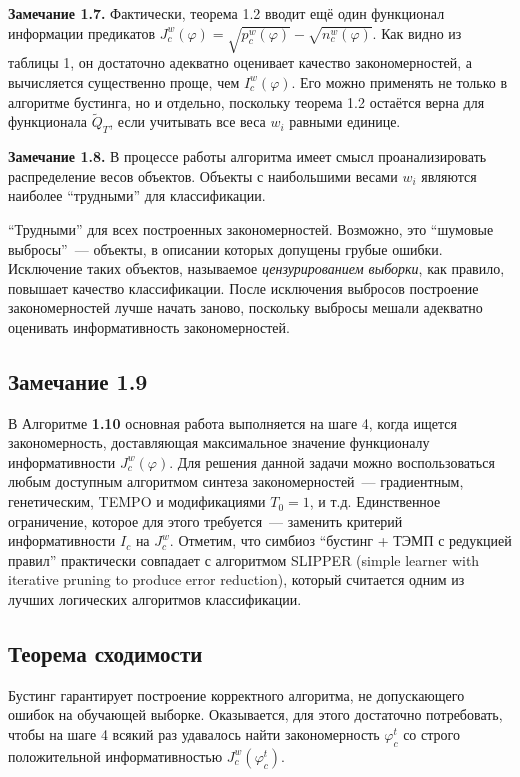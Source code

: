 \textbf{Замечание 1.7.} Фактически, теорема 1.2 вводит ещё один функционал информации предикатов $J_c^w(\varphi) = \sqrt{p_c^w(\varphi)} - \sqrt{n_c^w(\varphi)}$. Как видно из таблицы 1, он достаточно адекватно оценивает качество закономерностей, а вычисляется существенно проще, чем $I_c^w(\varphi)$. Его можно применять не только в алгоритме бустинга, но и отдельно, поскольку теорема 1.2 остаётся верна для функционала $\tilde{Q}_T$, если учитывать все веса $w_i$ равными единице.

\textbf{Замечание 1.8.} В процессе работы алгоритма имеет смысл проанализировать распределение весов объектов. Объекты с наибольшими весами $w_i$ являются наиболее ``трудными'' для классификации.

``Трудными'' для всех построенных закономерностей. Возможно, это ``шумовые выбросы''~--- объекты, в описании которых допущены грубые ошибки. Исключение таких объектов, называемое \textit{цензурированием выборки}, как правило, повышает качество классификации. После исключения выбросов построение закономерностей лучше начать заново, поскольку выбросы мешали адекватно оценивать информативность закономерностей.

\subsection*{Замечание 1.9}
В Алгоритме \textbf{1.10} основная работа выполняется на шаге 4, когда ищется закономерность, доставляющая максимальное значение функционалу информативности $J_c^w(\varphi)$. Для решения данной задачи можно воспользоваться любым доступным алгоритмом синтеза закономерностей~--- градиентным, генетическим, TEMPO и модификациями $T_0 = 1$, и т.д. Единственное ограничение, которое для этого требуется~--- заменить критерий информативности $I_c$ на $J_c^w$. Отметим, что симбиоз ``бустинг + ТЭМП с редукцией правил'' практически совпадает с алгоритмом SLIPPER (simple learner with iterative pruning to produce error reduction), который считается одним из лучших логических алгоритмов классификации.

\subsection*{Теорема сходимости}
Бустинг гарантирует построение корректного алгоритма, не допускающего ошибок на обучающей выборке. Оказывается, для этого достаточно потребовать, чтобы на шаге 4 всякий раз удавалось найти закономерность $\varphi_c^t$ со строго положительной информативностью $J_c^w(\varphi_c^t)$.

